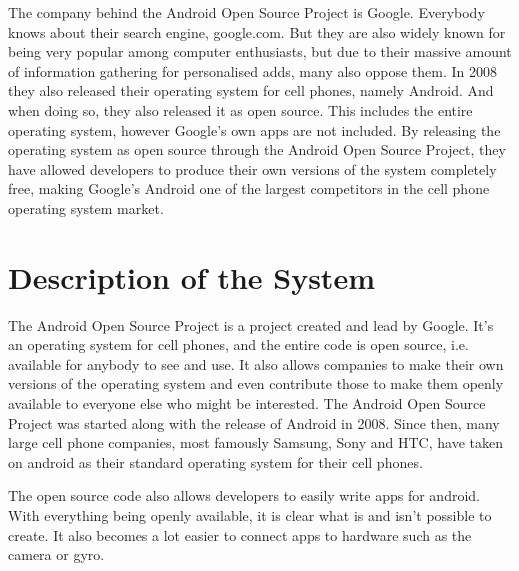 \documentclass[conference]{IEEEtran}
\begin{document}

The company behind the Android Open Source Project is Google.\cite{android} Everybody knows about their search engine, google.com. But they are also widely known for being very popular among computer enthusiasts, but due to their massive amount of information gathering for personalised adds, many also oppose them. In 2008 they also released their operating system for cell phones, namely Android.\cite{android-release} And when doing so, they also released it as open source.\cite{android} This includes the entire operating system, however Google's own apps are not included. By releasing the operating system as open source through the Android Open Source Project, they have allowed developers to produce their own versions of the system completely free, making Google's Android one of the largest competitors in the cell phone operating system market.\cite{android-market}


\section{Description of the System}
\label{system}

The Android Open Source Project is a project created and lead by Google. It's an operating system for cell phones, and the entire code is open source, i.e. available for anybody to see and use. It also allows companies to make their own versions of the operating system and even contribute those to make them openly available to everyone else who might be interested.\cite{android} The Android Open Source Project was started along with the release of Android in 2008. Since then, many large cell phone companies, most famously Samsung, Sony and HTC, have taken on android as their standard operating system for their cell phones. 

The open source code also allows developers to easily write apps for android. With everything being openly available, it is clear what is and isn't possible to create. It also becomes a lot easier to connect apps to hardware such as the camera or gyro.
\end{document}

